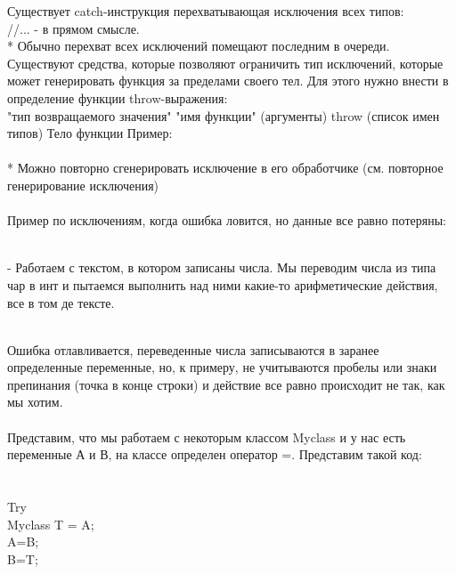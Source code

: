 \documentclass[a4paper,10pt]{article}
\begin{document}
Существует catch-инструкция перехватывающая исключения всех типов:
\\ //... - в прямом смысле.
\\

* Обычно перехват всех исключений помещают последним в очереди.
\\

Существуют средства, которые позволяют ограничить тип исключений, которые может генерировать функция за пределами своего тел. Для этого нужно внести в определение функции throw-выражения:
\\"тип возвращаемого значения" "имя функции" (аргументы) throw (список имен типов) {Тело функции}
Пример:
\\
\\

* Можно повторно сгенерировать исключение в его обработчике (см. повторное генерирование исключения)
\\

\\Пример по исключениям, когда ошибка ловится, но данные все равно потеряны:

\\- Работаем с текстом, в котором записаны числа. Мы переводим числа из типа чар в инт и пытаемся выполнить над ними какие-то арифметические действия, все в том де тексте. 

\\Ошибка отлавливается, переведенные числа записываются в заранее определенные переменные, но, к примеру, не учитываются пробелы или знаки препинания (точка в конце строки) и действие все равно происходит не так, как мы хотим.
\\
\\Представим, что мы работаем с некоторым классом Myclass и у нас есть переменные А и В, на классе определен оператор =. Представим такой код:
\\
\hline
\\
\\Try {
\\Myclass T = A;
\\A=B;
\\B=T;
\\}
\hline
\\
\end{document}
